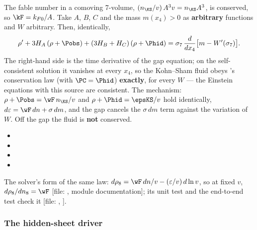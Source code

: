 The fable number in a comoving 7-volume, $(n_{\KS}/v)\,A^3v=n_{\KS}A^3$, is conserved, so $\kF=k_{F0}/A$.
Take $A$, $B$, $C$ and the mass $m(x_4)>0$ as \textbf{arbitrary} functions and $W$ arbitrary. Then,
identically,
\[
  \rho'+3H_A\,(\rho+\Pobs)+(3H_B+H_C)\,(\rho+\Phid)=\sigma_7\,\frac{d}{dx_4}\bigl[m-W'(\sigma_7)\bigr] .
\]
The right-hand side is the time derivative of the gap equation; on the self-consistent solution it
vanishes at every $x_4$, so the Kohn--Sham fluid obeys 's conservation law (with
$\PC=\Phid$) \textbf{exactly}, for every $W$ --- the Einstein equations with this source are consistent.
The mechanism: $\rho+\Pobs=\wF\,n_{\KS}/v$ and $\rho+\Phid=\epsKS/v$ hold identically,
$d\varepsilon=\wF\,dn+\sigma\,dm$, and the gap cancels the $\sigma\,dm$ term against the variation of $W$.
Off the gap the fluid is \textbf{not} conserved. 
\begin{itemize}
  \item {}
  \item {}
  \item {}
  \item {}
\end{itemize}

The solver's form of the same law: $d\rho_8=\wF\,dn/v-(\varepsilon/v)\,d\ln v$, so at fixed $v$,
$d\rho_8/dn_8=\wF$ [file: , module documentation]; its unit test
 and the end-to-end test
 check it [file: ,
].

\subsubsection{The hidden-sheet driver}
\label{sec:4.5.6}

